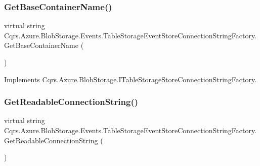 \subsubsection{\texorpdfstring{Get\+Base\+Container\+Name()}{GetBaseContainerName()}}
{\footnotesize\ttfamily virtual string Cqrs.\+Azure.\+Blob\+Storage.\+Events.\+Table\+Storage\+Event\+Store\+Connection\+String\+Factory.\+Get\+Base\+Container\+Name (\begin{DoxyParamCaption}{ }\end{DoxyParamCaption})\hspace{0.3cm}{\ttfamily [virtual]}}



Implements \hyperlink{interfaceCqrs_1_1Azure_1_1BlobStorage_1_1ITableStorageStoreConnectionStringFactory_a1b9bfc9dcb7292e62619fc46e4a85982_a1b9bfc9dcb7292e62619fc46e4a85982}{Cqrs.\+Azure.\+Blob\+Storage.\+I\+Table\+Storage\+Store\+Connection\+String\+Factory}.

\mbox{\label{classCqrs_1_1Azure_1_1BlobStorage_1_1Events_1_1TableStorageEventStoreConnectionStringFactory_a047e58aa30e97231dc913df350bc2446_a047e58aa30e97231dc913df350bc2446}} 
\subsubsection{\texorpdfstring{Get\+Readable\+Connection\+String()}{GetReadableConnectionString()}}
{\footnotesize\ttfamily virtual string Cqrs.\+Azure.\+Blob\+Storage.\+Events.\+Table\+Storage\+Event\+Store\+Connection\+String\+Factory.\+Get\+Readable\+Connection\+String (\begin{DoxyParamCaption}{ }\end{DoxyParamCaption})\hspace{0.3cm}{\ttfamily [virtual]}}



